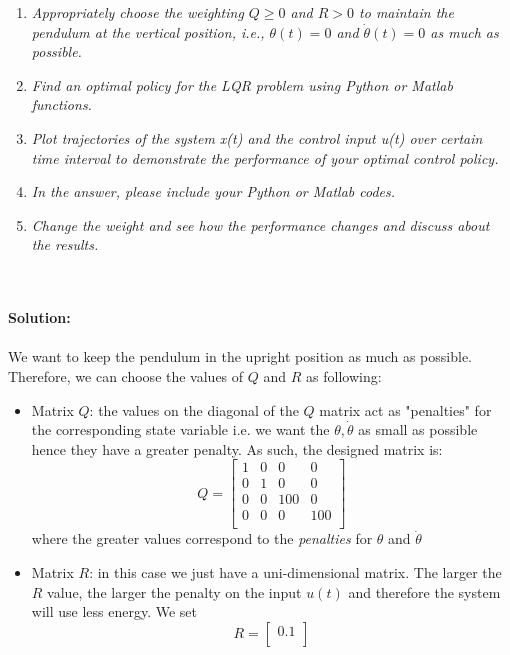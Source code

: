 \begin{enumerate}
    \item \emph{Appropriately choose the weighting $Q \geq 0$ and $R > 0$ to maintain the pendulum at the vertical position, i.e., $\theta(t) = 0$ and $\Dot{\theta}(t) = 0$ as much as possible.}
    \item \emph{Find an optimal policy for the LQR problem using Python or Matlab functions.}
    \item \emph{Plot trajectories of the system x(t) and the control input u(t) over certain time interval to demonstrate the performance of your optimal control policy.}
    \item \emph{In the answer, please include your Python or Matlab codes.}
    \item \emph{Change the weight and see how the performance changes and discuss about the results.}
\end{enumerate}
\\
\\
\textbf{Solution:}\\
\\

We want to keep the pendulum in the upright position as much as possible. Therefore, we can choose the values of $Q$ and $R$ as following:
\begin{itemize}
    \item Matrix $Q$: the values on the diagonal of the $Q$ matrix act as "penalties" for the corresponding state variable i.e. we want the $\theta, \dot{\theta}$ as small as possible hence they have a greater penalty. As such, the designed matrix is:
    \begin{equation}
        Q = \begin{bmatrix}
             1 & 0 & 0 &  0\\
             0 & 1 & 0 & 0\\
             0 & 0 & 100 & 0\\
             0 & 0 & 0 & 100\\
        \end{bmatrix}
    \end{equation}
    where the greater values correspond to the \emph{penalties} for $\theta$ and $\dot{\theta}$
    \item Matrix $R$: in this case we just have a uni-dimensional matrix. The larger the $R$ value, the larger the penalty on the input $u(t)$ and therefore the system will use less energy. We set
    \begin{equation}
        R = \begin{bmatrix}
            0.1\\
        \end{bmatrix}
    \end{equation}
\end{itemize}

